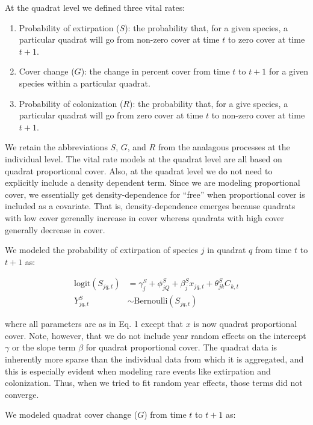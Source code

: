 \documentclass[12pt,]{article}
\begin{document}
At the quadrat level we defined three vital rates:

\begin{enumerate}
\def\labelenumi{\arabic{enumi}.}
\itemsep1pt\parskip0pt
\item
  Probability of extirpation ($S$): the probability that, for a given
  species, a particular quadrat will go from non-zero cover at time $t$
  to zero cover at time $t+1$.
\item
  Cover change ($G$): the change in percent cover from time $t$ to $t+1$
  for a given species within a particular quadrat.
\item
  Probability of colonization ($R$): the probability that, for a give
  species, a particular quadrat will go from zero cover at time $t$ to
  non-zero cover at time $t+1$.
\end{enumerate}

We retain the abbreviations $S$, $G$, and $R$ from the analagous
processes at the individual level. The vital rate models at the quadrat
level are all based on quadrat proportional cover. Also, at the quadrat
level we do not need to explicitly include a density dependent term.
Since we are modeling proportional cover, we essentially get
density-dependence for ``free'' when proportional cover is included as a
covariate. That is, density-dependence emerges because quadrats with low
cover gerenally increase in cover whereas quadrats with high cover
generally decrease in cover.

We modeled the probability of extirpation of species $j$ in quadrat $q$
from time $t$ to $t+1$ as:

\begin{align}
\text{logit}(S_{jq,t}) &= \gamma^{S}_{j} + \phi^{S}_{jQ} + \beta^{S}_{j}x_{jq,t} + \theta^{S}_{jk}C_{k,t} \\
Y^{S}_{jq,t} &\sim \text{Bernoulli}(S_{jq,t})
\end{align}

where all parameters are as in Eq. 1 except that $x$ is now quadrat
proportional cover. Note, however, that we do not include year random
effects on the intercept $\gamma$ or the slope term $\beta$ for quadrat
proportional cover. The quadrat data is inherently more sparse than the
individual data from which it is aggregated, and this is especially
evident when modeling rare events like extirpation and colonization.
Thus, when we tried to fit random year effects, those terms did not
converge.

We modeled quadrat cover change ($G$) from time $t$ to $t+1$ as:
\end{document}
